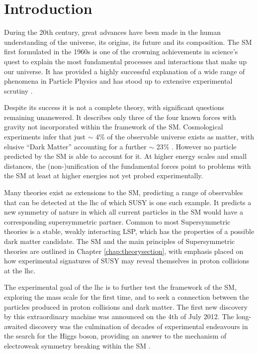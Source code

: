 \chapter{Introduction}
\label{chap:introduction}

During the 20th century, great advances have been made in the human understanding of the universe, its origins, its future and its composition. The \acf{SM} first formulated in the 1960s is one of the crowning achievements in science's quest to explain the most fundamental processes and interactions that make up our universe. It has provided a highly successful explanation of a wide range of phenomena in Particle Physics and has stood up to extensive experimental scrutiny \cite{pdg2012}.

Despite its success it is not  a complete theory, with significant questions remaining unanswered. It describes only three of the four known forces with gravity not incorporated within the framework of the \ac{SM}. Cosmological experiments infer that just $\sim$ 4$\%$ of the observable universe exists as matter, with elusive ``Dark Matter'' accounting for a further $\sim$ 23$\%$ \cite{0067-0049-208-2-19}. However no particle predicted by the \ac{SM} is able to account for it.  At higher energy scales and small distances, the (non-)unification of the fundamental forces point to problems with the \ac{SM} at least at higher energies not yet probed experimentally. 

Many theories exist as extensions to the \ac{SM}, predicting a range of observables that can be detected at the \acf{lhc} of which \acf{SUSY} is one such example. It predicts a new symmetry of nature in which all current particles in the \ac{SM} would have a corresponding supersymmetric partner. Common to most Supersymmetric theories is a stable, weakly interacting \acf{LSP}, which has the properties of a possible dark matter candidate. The \ac{SM} and the main principles of Supersymmetric theories are outlined in Chapter \ref{chap:theorysection}, with emphasis placed on how experimental signatures of \ac{SUSY} may reveal themselves in proton collisions at the \ac{lhc}.

The experimental goal of the \ac{lhc} is to further test the framework of the \ac{SM}, exploring the \TeV mass scale for the first time, and to seek a connection between the particles produced in proton collisions and dark matter. The first new discovery by this extraordinary machine was announced on the 4th of July 2012. The long-awaited discovery was the culmination of decades of experimental endeavours in the search for the Higgs boson, providing an answer to the mechanism of electroweak symmetry breaking within the \ac{SM} \cite{Aad:2012tfa}\cite{Chatrchyan:2012ufa}. 

